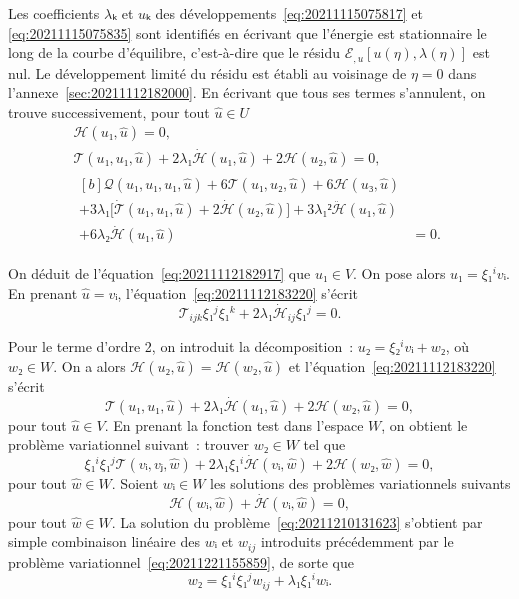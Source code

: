 \documentclass[12pt, final]{amsart}
\begin{document}
Les coefficients \(\lambda ₖ\) et \(uₖ\) des
développements~\eqref{eq:20211115075817} et \eqref{eq:20211115075835} sont
identifiés en écrivant que l'énergie est stationnaire le long de la courbe
d'équilibre, c'est-à-dire que le résidu
\(ℰ_{,u}[u(η), \lambda(η)]\) est nul. Le développement limité du
résidu est établi au voisinage de \(η=0\) dans
l'annexe~\ref{sec:20211112182000}. En écrivant que tous ses termes s'annulent,
on trouve successivement, pour tout \(\hat{u}∈ U\)
\begin{gather}
  \label{eq:20211112182917}
  ℋ(u₁, \hat{u})=0,\\
  \label{eq:20211112183220}
  \mathcal T(u₁, u₁, \hat{u})
  +2\lambda₁\dot{ℋ}(u₁, \hat{u})
  +2ℋ(u₂, \hat{u})=0,\\
  \begin{aligned}[b]
    \mathcal Q(u₁, u₁, u₁, \hat{u})
    +6\mathcal T(u₁, u₂, \hat{u})+6ℋ(u₃, \hat{u})&\\
    +3\lambda₁\bigl[\dot{\mathcal T}(u₁, u₁, \hat{u})
    +2\dot{ℋ}(u₂, \hat{u})\bigr]
    +3\lambda₁²\ddot{ℋ}(u₁, \hat{u})&\\
    +6\lambda₂\dot{ℋ}(u₁, \hat{u})&=0.
  \end{aligned}
\end{gather}

On déduit de l'équation~\eqref{eq:20211112182917} que \(u₁∈ V\). On pose
alors \(u₁=ξ₁^i vᵢ\). En prenant \(\hat{u}=vᵢ\),
l'équation~\eqref{eq:20211112183220} s'écrit
\begin{equation}
  \mathcal T_{ijk}ξ₁^jξ₁^k+2\lambda₁\dot{ℋ}_{ij}ξ₁^j=0.
\end{equation}

Pour le terme d'ordre 2, on introduit la décomposition~:
\(u₂=ξ₂^ivᵢ+w₂\), où \(w₂∈ W\). On a alors
\(ℋ(u₂, \hat{u})=ℋ(w₂, \hat{u})\) et
l'équation~\eqref{eq:20211112183220} s'écrit
\begin{equation}
  \mathcal T(u₁, u₁, \hat{u})+2\lambda₁\dot{ℋ}(u₁, \hat{u})
  +2ℋ(w₂, \hat{u})=0,
\end{equation}
pour tout \(\hat{u}∈ V\). En prenant la fonction test dans l'espace \(W\), on
obtient le problème variationnel suivant~: trouver \(w₂∈ W\) tel
que
\begin{equation}
  \label{eq:20211210131623}
  ξ₁^iξ₁^j\mathcal T(vᵢ, vⱼ, \hat{w})
  +2\lambda₁ξ₁^i\dot{ℋ}(vᵢ, \hat{w})
  +2ℋ(w₂, \hat{w})=0,
\end{equation}
pour tout \(\hat{w}∈ W\). Soient \(wᵢ∈ W\) les solutions des problèmes
variationnels suivants
\begin{equation}
  ℋ(wᵢ, \hat{w})+\dot{ℋ}(vᵢ, \hat{w})=0,
\end{equation}
pour tout \(\hat{w}∈ W\). La solution du problème~\eqref{eq:20211210131623}
s'obtient par simple combinaison linéaire des \(wᵢ\) et \(w_{ij}\) introduits
précédemment par le problème variationnel~\eqref{eq:20211221155859}, de sorte
que
\begin{equation}
  w₂=ξ₁^iξ₁^jw_{ij}+\lambda₁ξ₁^i wᵢ.
\end{equation}
\end{document}
